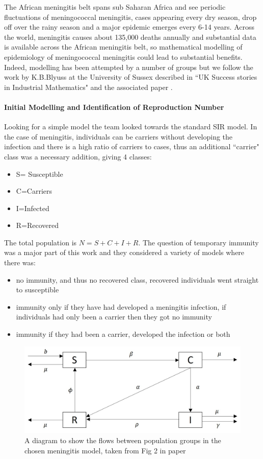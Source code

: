 \documentclass[11pt]{article} %
\begin{document}
The African meningitis belt spans sub Saharan Africa and see periodic fluctuations of meningococcal meningitis, cases appearing every dry season, drop off over the rainy season and a major epidemic emerges every 6-14 years. Across the world, meningitis causes about 135,000 deaths annually and substantial data is available across the African meningitis belt, so mathematical modelling of epidemiology of meningococcal meningitis could lead to substantial benefits. Indeed, modelling has been attempted by a number of groups but we follow the work by K.B.Blyuss at the University of Sussex described in ``UK Success stories in Industrial Mathematics" and the associated paper \cite{Irving2012}.


\paragraph{Initial Modelling and Identification of Reproduction Number  }
Looking for a simple model the team looked towards the standard SIR model. In the case of meningitis, individuals can be carriers without developing the infection and there is a high ratio of carriers to cases, thus an additional ``carrier" class was a necessary addition, giving 4 classes: 
\begin{itemize}
	\item S= Susceptible
	\item C=Carriers
	\item I=Infected
	\item R=Recovered
\end{itemize}
The total population is $ N=S+C+I+R $. The question of temporary immunity was a major part of this work and they considered a variety of models where there was:
\begin{itemize}
	\item no immunity, and thus no recovered class, recovered individuals went straight  to susceptible 
	\item   immunity only if they have had developed a meningitis infection, if individuals had only been a carrier then they got no immunity
	\item immunity if they had been a carrier, developed the infection or both
\end{itemize}

\begin{figure}
	\centering
	\includegraphics[width=0.9\linewidth]{Report_images/meningitis_model}
	\caption{A diagram to show the flows between population groups in the chosen meningitis model, taken from Fig 2 in paper  \cite{Irving2012}}
	\label{fig:meningitismodel}
\end{figure}
\end{document}
